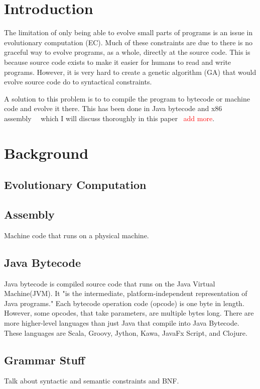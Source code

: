 \documentclass{sig-alternate}
\newcommand{\mycomment}[1]{\textcolor{red}{#1}}
\begin{document}
\terms{}

\keywords{}

\section{Introduction}
	The limitation of only being able to evolve small parts of programs is an issue in evolutionary computation (EC). Much of these constraints are due to there is no graceful way to evolve programs, as a whole, directly at the source code. This is because source code exists to make it easier for humans to read and write programs. However, it is very hard to create a genetic algorithm (GA) that would evolve source code do to syntactical constraints.\par
	A solution to this problem is to to compile the program to bytecode or machine code and evolve it there. This has been done in Java bytecode and x86 assembly~\cite{FINCH:2011}~\cite{Assembly:2010} which I will discuss thoroughly in this paper ~\mycomment{add more}.
	

	
	

\section{Background}

\subsection{Evolutionary Computation}
\subsection{Assembly}
Machine code that runs on a physical machine.
\subsection{Java Bytecode}
Java bytecode is compiled source code that runs on the Java Virtual Machine(JVM). It "is the intermediate, platform-independent representation of Java programs\cite{VIII:2011}." Each bytecode operation code (opcode) is one byte in length. However, some opcodes, that take parameters, are multiple bytes long\cite{JavaBytecode:2014}.
There are more higher-level languages than just Java that compile into Java Bytecode. These languages are Scala, Groovy, Jython, Kawa, JavaFx Script, and Clojure\cite{FINCH:2011}.


\subsection{Grammar Stuff}
Talk about syntactic and semantic constraints and BNF.
\end{document}
